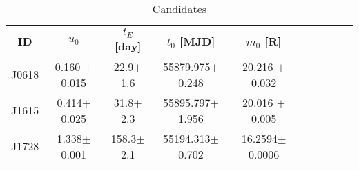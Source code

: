 \documentclass{emulateapj}
\begin{document}
\renewcommand*\arraystretch{1.8}
\begin{table}
\scriptsize
\centering
\caption{Candidates} 
\begin{tabular}{| c | c | c | c | c | c | c | c | c | c |}
\hline
ID & $u_0$ & $t_E$ [day] & $t_0$ [MJD] & $m_0$ [R] \\
\hline
J0618 & 0.160 $\pm$ 0.015 & 22.9$\pm$1.6 & 55879.975$\pm$0.248 & 20.216 $\pm$ 0.032\\\hline
J1615 & 0.414$\pm$0.025 & 31.8$\pm$2.3  & 55895.797$\pm$1.956 & 20.016 $\pm$ 0.005\\\hline
J1728 & 1.338$\pm$0.001 & 158.3$\pm$2.1 & 55194.313$\pm$0.702 & 16.2594$\pm$0.0006 \\\hline
\end{tabular}
\label{table:candidates1}
\end{table}
\end{document}
